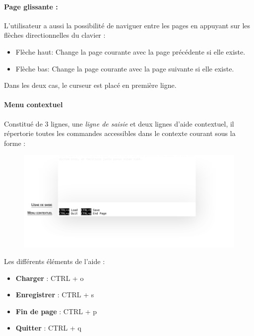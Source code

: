 \paragraph{Page glissante :}
L'utilisateur a aussi la possibilité de naviguer entre les pages en appuyant sur les flèches directionnelles du clavier :
\begin{itemize}
	\item \og Flèche haut\fg : Change la page courante avec la page précédente si elle existe.
	\item \og Flèche bas\fg : Change la page courante avec la page suivante si elle existe.
\end{itemize}
Dans les deux cas, le curseur est placé en première ligne.

\paragraph{Menu contextuel}
Constitué de 3 lignes, une \textsl{ligne de saisie} et deux lignes d'aide contextuel, il répertorie toutes les commandes accessibles dans le contexte courant sous la forme :
\begin{center}
\begin{figure}[H]
    \includegraphics[width=15cm]{img/MenuContextuel}
	\vspace{-1cm}
\end{figure}
\end{center}

Les différents éléments de l'aide :
\begin{itemize}
	\item \textbf{Charger} : \og CTRL + o\fg
	\item \textbf{Enregistrer} : \og CTRL + s\fg
	\item \textbf{Fin de page} : \og CTRL + p\fg
	\item \textbf{Quitter} : \og CTRL + q\fg
\end{itemize}

